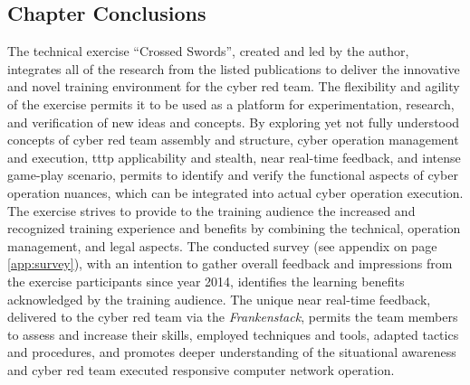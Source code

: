 \subsection{Chapter Conclusions}
The technical exercise ``Crossed Swords'', created and led by the author, integrates all of the research from the listed publications to deliver the innovative and novel training environment for the cyber red team. The flexibility and agility of the exercise permits it to be used as a platform for experimentation, research, and verification of new ideas and concepts. By exploring yet not fully understood concepts of cyber red team assembly and structure, cyber operation management and execution, \gls{tttp} applicability and stealth, near real-time feedback, and intense game-play scenario, permits to identify and verify the functional aspects of cyber operation nuances, which can be integrated into actual cyber operation execution.
The exercise strives to provide to the training audience the increased and recognized training experience and benefits by combining the technical, operation management, and legal aspects. The conducted survey (see appendix on page \ref{app:survey}), with an intention to gather overall feedback and impressions from the exercise participants since year 2014, identifies the learning benefits acknowledged by the training audience.
The unique near real-time feedback, delivered to the cyber red team via the \textit{Frankenstack}, permits the team members to assess and increase their skills, employed techniques and tools, adapted tactics and procedures, and promotes deeper understanding of the situational awareness and cyber red team executed responsive computer network operation.
